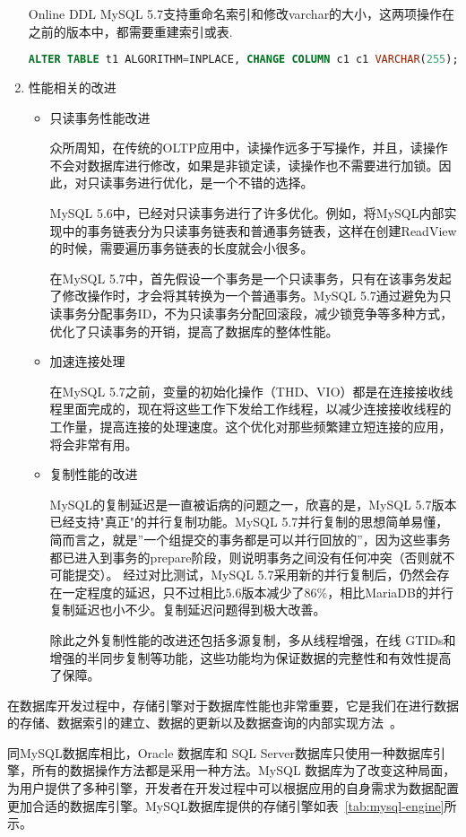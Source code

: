 \begin{enumerate}
Online DDL MySQL 5.7支持重命名索引和修改varchar的大小，这两项操作在之前的版本中，都需要重建索引或表.
\begin{lstlisting}[language=sql,numbers=none]
ALTER TABLE t1 ALGORITHM=INPLACE, CHANGE COLUMN c1 c1 VARCHAR(255);
\end{lstlisting}

\item 性能相关的改进
\begin{itemize}
\item 只读事务性能改进

众所周知，在传统的OLTP应用中，读操作远多于写操作，并且，读操作不会对数据库进行修改，如果是非锁定读，读操作也不需要进行加锁。因此，对只读事务进行优化，是一个不错的选择。

MySQL 5.6中，已经对只读事务进行了许多优化。例如，将MySQL内部实现中的事务链表分为只读事务链表和普通事务链表，这样在创建ReadView的时候，需要遍历事务链表的长度就会小很多。

在MySQL 5.7中，首先假设一个事务是一个只读事务，只有在该事务发起了修改操作时，才会将其转换为一个普通事务。MySQL 5.7通过避免为只读事务分配事务ID，不为只读事务分配回滚段，减少锁竞争等多种方式，优化了只读事务的开销，提高了数据库的整体性能。
\item 加速连接处理

在MySQL 5.7之前，变量的初始化操作（THD、VIO）都是在连接接收线程里面完成的，现在将这些工作下发给工作线程，以减少连接接收线程的工作量，提高连接的处理速度。这个优化对那些频繁建立短连接的应用，将会非常有用。
\item 复制性能的改进

MySQL的复制延迟是一直被诟病的问题之一，欣喜的是，MySQL 5.7版本已经支持"真正"的并行复制功能。MySQL 5.7并行复制的思想简单易懂，简而言之，就是”一个组提交的事务都是可以并行回放的”，因为这些事务都已进入到事务的prepare阶段，则说明事务之间没有任何冲突（否则就不可能提交）。 经过对比测试，MySQL 5.7采用新的并行复制后，仍然会存在一定程度的延迟，只不过相比5.6版本减少了86\%，相比MariaDB的并行复制延迟也小不少。复制延迟问题得到极大改善。

除此之外复制性能的改进还包括多源复制，多从线程增强，在线 GTIDs和增强的半同步复制等功能，这些功能均为保证数据的完整性和有效性提高了保障。
\end{itemize}
\end{enumerate}

在数据库开发过程中，存储引擎对于数据库性能也非常重要，它是我们在进行数据的存储、数据索引的建立、数据的更新以及数据查询的内部实现方法~\cite{胡雯2012mysql}。

同MySQL数据库相比，Oracle 数据库和 SQL Server数据库只使用一种数据库引擎，所有的数据操作方法都是采用一种方法。MySQL 数据库为了改变这种局面，为用户提供了多种引擎，开发者在开发过程中可以根据应用的自身需求为数据配置更加合适的数据库引擎。MySQL数据库提供的存储引擎如表~\ref{tab:mysql-engine}所示。

